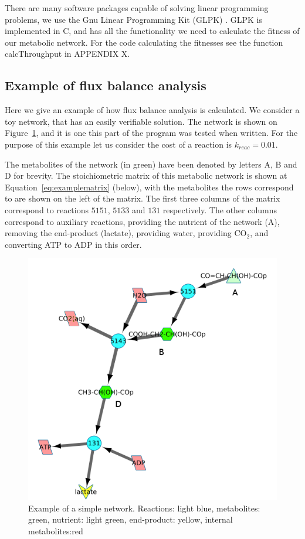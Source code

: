 \documentclass[a4paper,12pt]{article}
\begin{document}
	There are many software packages capable of solving linear programming problems, we use the Gnu Linear Programming Kit (GLPK) \cite{glpk}. GLPK is implemented in C, and has all the functionality we need to calculate the fitness of our metabolic network. For the code calculating the fitnesses see the function calcThroughput in APPENDIX X.


\subsection{Example of flux balance analysis}
\label{sub:example_of_flux_balance_analysis}

Here we give an example of how flux balance analysis is calculated. We consider a toy network, that has an easily verifiable solution. The network is shown on Figure~\ref{fig:examplenetwork}, and it is one this part of the program was tested when written. For the purpose of this example let us consider the cost of a reaction is $k_{reac}=0.01$.


	The metabolites of the network (in green) have been denoted by letters A, B and D for brevity. The stoichiometric matrix of this metabolic network is shown at Equation~\ref{eq:examplematrix} (below), with the metabolites the rows correspond to are shown on the left of the matrix. The first three columns of the matrix correspond to reactions $5151$, $5133$ and $131$ respectively. The other columns correspond to auxiliary reactions, providing the nutrient of the network (A), removing the end-product (lactate), providing water, providing CO$_2$, and converting ATP to ADP in this order.

\begin{figure}[htbp]
	\centering
	\includegraphics[width=0.5\linewidth]{initial_network_ABC.png}
	\caption{Example of a simple network. Reactions: light blue, metabolites: green, nutrient: light green, end-product: yellow, internal metabolites:red}
	\label{fig:examplenetwork}
\end{figure}
\end{document}
